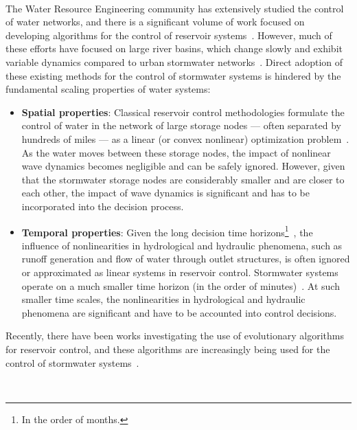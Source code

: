 \

The Water Resource Engineering community has extensively studied the control of water networks, and there is a significant volume of work focused on developing algorithms for the control of reservoir systems~\cite{Haimes_1977,Labadie_2004,Yeh_1985,Reed_Hadka_Herman_Kasprzyk_Kollat_2013}.
However, much of these efforts have focused on large river basins, which change slowly and exhibit variable dynamics compared to urban stormwater networks~\cite{loucks2017water, te2010applied}.
Direct adoption of these existing methods for the control of stormwater systems is hindered by the fundamental scaling properties of water systems:
\begin{itemize}
	\item \textbf{Spatial properties}: Classical reservoir control methodologies formulate the control of water in the network of large storage nodes --- often separated by hundreds of miles --- as a linear (or convex nonlinear) optimization problem~\cite{Haimes_1977}.
As the water moves between these storage nodes, the impact of nonlinear wave dynamics becomes negligible and can be safely ignored.
However, given that the stormwater storage nodes are considerably smaller and are closer to each other, the impact of wave dynamics is significant and has to be incorporated into the decision process. 
\item \textbf{Temporal properties}: Given the long decision time horizons\footnote{In the order of months.}~\cite{You_Cai_2008}, the influence of nonlinearities in hydrological and hydraulic phenomena, such as runoff generation and flow of water through outlet structures, is often ignored or approximated as linear systems in reservoir control.
Stormwater systems operate on a much smaller time horizon (in the order of minutes)~\cite{lund2018}.
At such smaller time scales, the nonlinearities in hydrological and hydraulic phenomena are significant and have to be accounted into control decisions.
\end{itemize}
Recently, there have been works investigating the use of evolutionary algorithms~\cite{Reed_Hadka_Herman_Kasprzyk_Kollat_2013, maier2014,Bessler_Savic_Walters_2003} for reservoir control, and these algorithms are increasingly being used for the control of stormwater systems~\cite{shishegar2018optimization,lund2018}.

\


